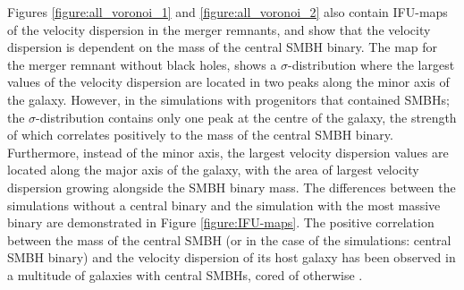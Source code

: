 \documentclass[english, oneside]{HYgradu}
\begin{document}
Figures \ref{figure:all_voronoi_1} and \ref{figure:all_voronoi_2} also contain IFU-maps of the velocity dispersion in the merger remnants, and show that the velocity dispersion is dependent on the mass of the central SMBH binary. The map for the merger remnant without black holes, shows a $\sigma$-distribution where the largest values of the velocity dispersion are located in two peaks along the minor axis of the galaxy. However, in the simulations with progenitors that contained SMBHs; the $\sigma$-distribution contains only one peak at the centre of the galaxy, the strength of which correlates positively to the mass of the central SMBH binary. Furthermore, instead of the minor axis, the largest velocity dispersion values are located along the major axis of the galaxy, with the area of largest velocity dispersion growing alongside the SMBH binary mass. The differences between the simulations without a central binary and the simulation with the most massive binary are demonstrated in Figure \ref{figure:IFU-maps}. The positive correlation between the mass of the central SMBH (or in the case of the simulations: central SMBH binary) and the velocity dispersion of its host galaxy has been observed in a multitude of galaxies with central SMBHs, cored of otherwise \citep{Ferrarese2000}.
\end{document}
